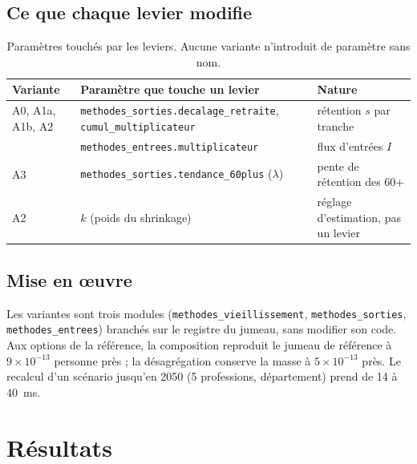 \subsection{Ce que chaque levier modifie}
\begin{table}[h]
\centering\small
\begin{tabular}{@{}p{}p{}p{}@{}}
\toprule
Variante & Paramètre que touche un levier & Nature \\
\midrule
A0, A1a, A1b, A2 & \texttt{methodes\_sorties.}\allowbreak\texttt{decalage\_retraite}, \texttt{cumul\_multiplicateur} & rétention $s$ par tranche \\
 & \texttt{methodes\_entrees.multiplicateur} & flux d'entrées $I$ \\
A3 & \texttt{methodes\_sorties.tendance\_60plus} ($\lambda$) & pente de rétention des 60+ \\
A2 & $k$ (poids du shrinkage) & réglage d'estimation, pas un levier \\
\bottomrule
\end{tabular}
\caption{Paramètres touchés par les leviers. Aucune variante n'introduit de paramètre sans nom.}
\end{table}

\subsection{Mise en \oe{}uvre}
Les variantes sont trois modules (\texttt{methodes\_vieillissement}, \texttt{methodes\_sorties},
\texttt{methodes\_entrees}) branchés sur le registre du jumeau, sans modifier son code. Aux options de
la référence, la composition reproduit le jumeau de référence à $9 \times 10^{-13}$\mesure{} personne
près ; la désagrégation conserve la masse à $5 \times 10^{-13}$\mesure{} près. Le recalcul d'un
scénario jusqu'en 2050 (5 professions, département) prend de 14 à 40\mesure{}~ms.

\section{Résultats}
